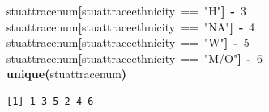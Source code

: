\documentclass[12pt]{article}
\makeatletter
\newcommand{\hlnumber}[1]{\textcolor[rgb]{0,0,0}{#1}}%
\newcommand{\hlfunctioncall}[1]{\textcolor[rgb]{0.501960784313725,0,0.329411764705882}{\textbf{#1}}}%
\newcommand{\hlstring}[1]{\textcolor[rgb]{0.6,0.6,1}{#1}}%
\newcommand{\hlkeyword}[1]{\textcolor[rgb]{0,0,0}{\textbf{#1}}}%
\newcommand{\hlassignement}[1]{\textcolor[rgb]{0,0,0}{\textbf{#1}}}%
\newcommand{\hlsymbol}[1]{\textcolor[rgb]{0,0,0}{#1}}%
\newcommand{\hlstd}[1]{\textcolor[rgb]{0,0,0}{#1}}%
\newenvironment{kframe}{%
 \def\FrameCommand##1{\hskip\@totalleftmargin \hskip-\fboxsep
 \colorbox{shadecolor}{##1}\hskip-\fboxsep
     \hskip-\linewidth \hskip-\@totalleftmargin \hskip\columnwidth}%
 \MakeFramed {\advance\hsize-\width
   \@totalleftmargin\z@ \linewidth\hsize
   \@setminipage}}%
 {\par\unskip\endMakeFramed}
\newenvironment{knitrout}{}{} %
\renewenvironment{knitrout}{\begin{footnotesize}}{\end{footnotesize}}
\makeatother
\begin{document}
\begin{knitrout}
\begin{kframe}
\begin{flushleft}
\hlstd{}\hlsymbol{stuatt}\hlkeyword{\usebox{\hlnormalsizeboxdollar}}\hlsymbol{race\usebox{\hlnormalsizeboxunderscore}num}\hlkeyword{[}\hlsymbol{stuatt}\hlkeyword{\usebox{\hlnormalsizeboxdollar}}\hlsymbol{race\usebox{\hlnormalsizeboxunderscore}ethnicity}{\ }=={\ }\hlstring{"{}H"{}}\hlkeyword{]}{\ }\hlassignement{\usebox{\hlnormalsizeboxlessthan}-}{\ }\hlnumber{3}\hspace*{\fill}\\
\hlstd{}\hlsymbol{stuatt}\hlkeyword{\usebox{\hlnormalsizeboxdollar}}\hlsymbol{race\usebox{\hlnormalsizeboxunderscore}num}\hlkeyword{[}\hlsymbol{stuatt}\hlkeyword{\usebox{\hlnormalsizeboxdollar}}\hlsymbol{race\usebox{\hlnormalsizeboxunderscore}ethnicity}{\ }=={\ }\hlstring{"{}NA"{}}\hlkeyword{]}{\ }\hlassignement{\usebox{\hlnormalsizeboxlessthan}-}{\ }\hlnumber{4}\hspace*{\fill}\\
\hlstd{}\hlsymbol{stuatt}\hlkeyword{\usebox{\hlnormalsizeboxdollar}}\hlsymbol{race\usebox{\hlnormalsizeboxunderscore}num}\hlkeyword{[}\hlsymbol{stuatt}\hlkeyword{\usebox{\hlnormalsizeboxdollar}}\hlsymbol{race\usebox{\hlnormalsizeboxunderscore}ethnicity}{\ }=={\ }\hlstring{"{}W"{}}\hlkeyword{]}{\ }\hlassignement{\usebox{\hlnormalsizeboxlessthan}-}{\ }\hlnumber{5}\hspace*{\fill}\\
\hlstd{}\hlsymbol{stuatt}\hlkeyword{\usebox{\hlnormalsizeboxdollar}}\hlsymbol{race\usebox{\hlnormalsizeboxunderscore}num}\hlkeyword{[}\hlsymbol{stuatt}\hlkeyword{\usebox{\hlnormalsizeboxdollar}}\hlsymbol{race\usebox{\hlnormalsizeboxunderscore}ethnicity}{\ }=={\ }\hlstring{"{}M/O"{}}\hlkeyword{]}{\ }\hlassignement{\usebox{\hlnormalsizeboxlessthan}-}{\ }\hlnumber{6}\hspace*{\fill}\\
\hlstd{}\hlfunctioncall{unique}\hlkeyword{(}\hlsymbol{stuatt}\hlkeyword{\usebox{\hlnormalsizeboxdollar}}\hlsymbol{race\usebox{\hlnormalsizeboxunderscore}num}\hlkeyword{)}\mbox{}
\normalfont
\end{flushleft}
\begin{verbatim}
[1] 1 3 5 2 4 6
\end{verbatim}
\end{kframe}
\end{knitrout}

\end{document}
